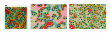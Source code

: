 \begin{itemize}
\includegraphics[height=1.4cm]{python_codes/fieldstone_171/images/pear93_alpha}
\includegraphics[height=1.4cm]{python_codes/fieldstone_171/images/munafo_alpha1}
\includegraphics[height=1.4cm]{python_codes/fieldstone_171/images/munafo_alpha2}


\end{itemize}
